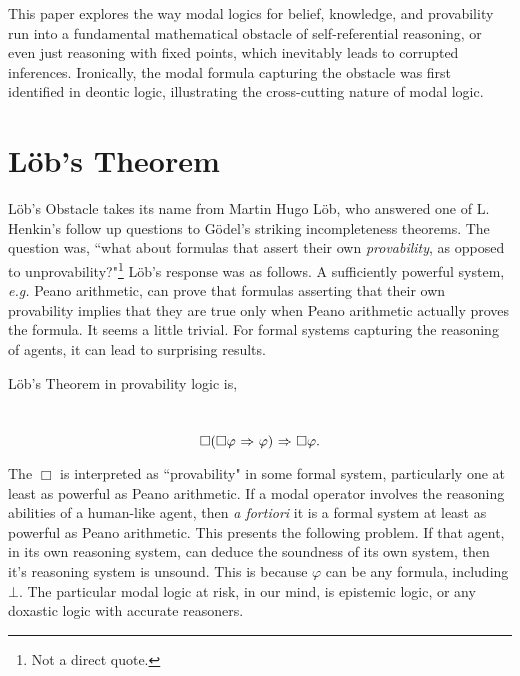 This paper explores the way modal logics for belief, knowledge, and provability run into a fundamental mathematical obstacle of self-referential reasoning, or even just reasoning with fixed points, which inevitably leads to corrupted inferences. Ironically, the modal formula capturing the obstacle was first identified in deontic logic, illustrating the cross-cutting nature of modal logic.

\section{L\"ob's Theorem}
\label{sec:lob_section}
L\"ob's Obstacle takes its name from Martin Hugo L\"ob, who answered one of L. Henkin's follow up questions to G\"odel's striking incompleteness theorems. The question was, ``what about formulas that assert their own \emph{provability}, as opposed to unprovability?"\footnote{Not a direct quote.} L\"ob's response was as follows. A sufficiently powerful system, \emph{e.g.} Peano arithmetic, can prove that formulas asserting that their own provability implies that they are true only when Peano arithmetic actually proves the formula. It seems a little trivial. For formal systems capturing the reasoning of agents, it can lead to surprising results.

L\"ob's Theorem in provability logic is,
\begin{center}~\label{lob}
	\begin{equation}
		\Box(\Box\varphi {\ \Rightarrow \ } \varphi){\ \Rightarrow \ } \Box\varphi.
	\end{equation}
\end{center}
The $\Box$ is interpreted as ``provability" in some formal system, particularly one at least as powerful as Peano arithmetic. If a modal operator involves the reasoning abilities of a human-like agent, then \emph{a fortiori} it is a formal system at least as powerful as Peano arithmetic. This presents the following problem. If that agent, in its own reasoning system, can deduce the soundness of its own system, then it's reasoning system is unsound. This is because $\varphi$ can be any formula, including $\bot$. The particular modal logic at risk, in our mind, is epistemic logic, or any doxastic logic with accurate reasoners.

